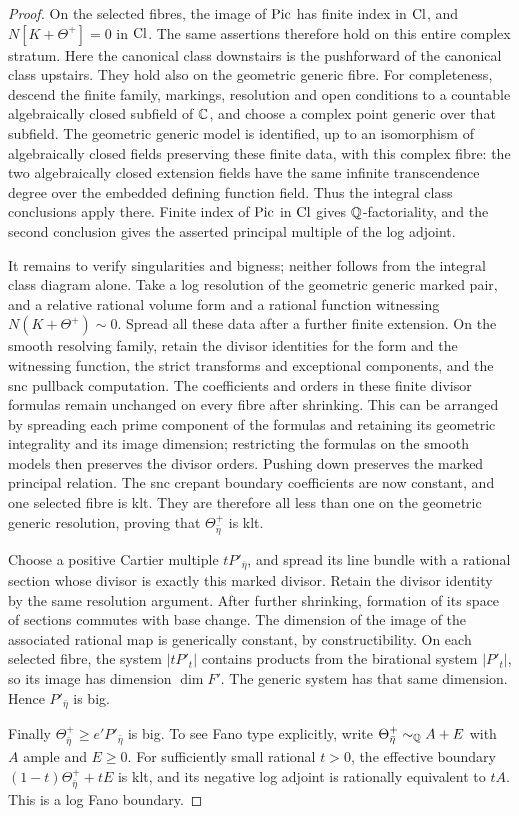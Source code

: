 \begin{proof}
On the selected fibres, the image of \(\operatorname{Pic}\) has finite index in
\(\operatorname{Cl}\), and \(N[K+\Theta^+]=0\) in \(\operatorname{Cl}\). The same assertions
therefore hold on this entire complex stratum. Here the canonical class
downstairs is the pushforward of the canonical class upstairs. They hold
also on the geometric generic fibre. For completeness, descend the finite
family, markings, resolution and open conditions to a countable
algebraically closed subfield of \(\mathbb C\), and choose a complex point
generic over that subfield. The geometric generic model is identified,
up to an isomorphism of algebraically closed fields preserving these
finite data, with this complex fibre: the two algebraically closed
extension fields have the same infinite transcendence degree over the
embedded defining function field. Thus the integral class conclusions
apply there. Finite index of \(\operatorname{Pic}\) in \(\operatorname{Cl}\) gives
\(\mathbb Q\)-factoriality, and the second conclusion gives the asserted
principal multiple of the log adjoint.

It remains to verify singularities and bigness; neither follows from the
integral class diagram alone. Take a log resolution of the geometric
generic marked pair, and a relative rational volume form and a rational
function witnessing \(N(K+\Theta^+)\sim0\). Spread all these data after
a further finite extension. On the smooth resolving family, retain the
divisor identities for the form and the witnessing function, the strict
transforms and exceptional components, and the snc pullback computation.
The coefficients and orders in these finite divisor formulas remain
unchanged on every fibre after shrinking. This can be arranged by spreading
each prime component of the formulas and retaining its geometric
integrality and its image dimension; restricting the formulas on the
smooth models then preserves the divisor orders. Pushing down preserves
the marked principal relation. The snc crepant boundary coefficients are now
constant, and one selected fibre is klt. They are therefore all less than
one on the geometric generic resolution, proving that
\(\Theta^+_{\bar\eta}\) is klt.

Choose a positive Cartier multiple \(tP'_{\bar\eta}\), and spread its
line bundle with a rational section whose divisor is exactly this marked
divisor. Retain the divisor identity by the same resolution argument.
After further shrinking, formation of its space of sections commutes with
base change. The dimension of the image of the associated rational map
is generically constant, by constructibility. On each selected fibre,
the system \(|tP'_t|\) contains products from the birational system
\(|P'_t|\), so its image has dimension \(\dim F'\). The generic system
has that same dimension. Hence \(P'_{\bar\eta}\) is big.

Finally \(\Theta^+_{\bar\eta}\geq e'P'_{\bar\eta}\) is big. To see
Fano type explicitly, write
\(\Theta^+_{\bar\eta}\sim_{\mathbb Q}A+E\) with \(A\) ample and \(E\geq0\).
For sufficiently small rational \(t>0\), the effective boundary
\((1-t)\Theta^+_{\bar\eta}+tE\) is klt, and its negative log adjoint
is rationally equivalent to \(tA\). This is a log Fano boundary.
\end{proof}

